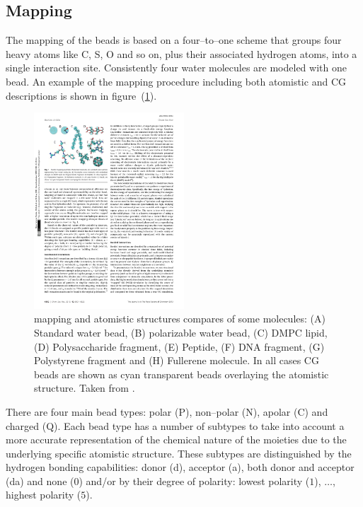 \subsection{Mapping}
The mapping of the \martini beads is based on a four--to--one scheme that groups four heavy atoms like C, S, O
and so on, plus their associated hydrogen atoms, into a single interaction site. Consistently four water
molecules are modeled with one \martini bead. An example of the mapping procedure including both atomistic and
\ac{CG} descriptions is shown in figure~(\ref{fig:martiniMapping}).
\begin{figure}[!ht]
	\centering
	\includegraphics[width=0.5\textwidth]{img/martiniMapping}
	\caption{\martini mapping and atomistic structures compares of some molecules: (A) Standard water bead, (B) polarizable water bead, (C) \acs{DMPC} lipid, (D) Polysaccharide fragment, (E) Peptide, (F) DNA fragment, (G) Polystyrene fragment and (H) Fullerene molecule. In all cases \martini \acs{CG} beads are shown as cyan transparent beads overlaying the atomistic structure. Taken from \cite{MartiniReview}.}
	\label{fig:martiniMapping}
\end{figure}

There are four main bead types: polar (P), non--polar (N), apolar (C) and charged (Q). Each bead type has a
number of subtypes to take into account a more accurate representation of the chemical nature of the moieties due
to the underlying specific atomistic structure. These subtypes are distinguished by the hydrogen bonding
capabilities: donor (d), acceptor (a), both donor and acceptor (da) and none ($0$) and/or by their degree of
polarity: lowest polarity ($1$), $\dots$, highest polarity ($5$).

